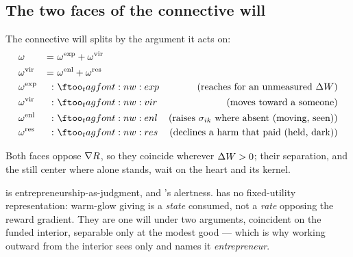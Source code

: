 \documentclass[../main]{subfiles}
\begin{document}
\subsection{The two faces of the connective will}
\label{subsec:will:faces}
%
\begin{definition}
  The connective will splits by the argument it acts on:
  \begin{align}
    &\will        &=& \ \willexpand + \willvirtue \label{eq:w:faces}\\
    &\willvirtue  &=& \ \willenlarge + \willrestrain \label{eq:w:virtue}\\
    &\willexpand  &:& \eqtag{w:exp}{reaches for an unmeasured $\surplus$}\\
    &\willvirtue  &:& \eqtag{w:vir}{moves toward a someone}\\
    &\willenlarge &:& \eqtag{w:enl}{raises $\alignpair{i}{k}$ where absent (moving, seen)}\\
    &\willrestrain &:& \eqtag{w:res}{declines a harm that paid (held, dark)}
  \end{align}
\end{definition}

Both faces oppose $\nabla R$, so they coincide wherever $\Delta W>0$; their
separation, and the still center where  alone stands, wait on the heart and its
kernel.

\begin{econ}[label=e:faces, title={One will under two arguments}, ref=w:vir,
  cites={a:knight,a:kirzner,a:andreoni}, departs=annex,
  stopsat={warm-glow is a state consumed, not a rate opposing the gradient}]
   is entrepreneurship-as-judgment, \textcite{a:knight} and \textcite{a:kirzner}'s
  alertness.  has no fixed-utility representation: warm-glow giving
  \parencite{a:andreoni} is a \emph{state} consumed, not a \emph{rate} opposing the reward
  gradient. They are one will under two arguments, coincident on the funded interior,
  separable only at the modest good --- which is why working outward from the interior sees
  only  and names it \emph{entrepreneur}.
\end{econ}
\end{document}
